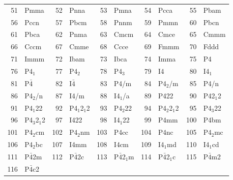 \documentclass[final,12pt,makeidx,DIV=calc]{article}
\begin{document}
{{{{{{\begin{table}[h!]
\begin{center}
\begin{tabular}{||r|l||r|l||r|l||r|l||r|l||}
51     & Pmma               & 
52     & Pnna               & 
53     & Pmna               & 
54     & Pcca               & 
55     & Pbam               \\
56     & Pccn               & 
57     & Pbcm               & 
58     & Pnnm               & 
59     & Pmmn               & 
60     & Pbcn               \\
61     & Pbca               & 
62     & Pnma               & 
63     & Cmcm               & 
64     & Cmce               & 
65     & Cmmm               \\
66     & Cccm               & 
67     & Cmme               & 
68     & Ccce               & 
69     & Fmmm               & 
70     & Fddd               \\
71     & Immm               & 
72     & Ibam               & 
73     & Ibca               & 
74     & Imma               & 
75     & P4                 \\
76     & P4$_1$             & 
77     & P4$_2$             & 
78     & P4$_3$             & 
79     & I4                 & 
80     & I4$_1$             \\
81     & P$\bar{4}$                & 
82     & I$\bar{4}$                & 
83     & P4/m               & 
84     & P4$_2$/m           & 
85     & P4/n               \\
86     & P4$_2$/n           & 
87     & I4/m               & 
88     & I4$_1$/a           & 
89     & P422               & 
90     & P42$_1$2           \\
91     & P4$_1$22           & 
92     & P4$_1$2$_1$2       & 
93     & P4$_2$22           & 
94     & P4$_2$2$_1$2       & 
95     & P4$_3$22           \\
96     & P4$_3$2$_1$2       & 
97     & I422               & 
98     & I4$_1$22           & 
99     & P4mm               & 
100    & P4bm               \\
101    & P4$_2$cm           & 
102    & P4$_2$nm           & 
103    & P4cc               & 
104    & P4nc               & 
105    & P4$_2$mc           \\
106    & P4$_2$bc           & 
107    & I4mm               & 
108    & I4cm               & 
109    & I4$_1$md           & 
110    & I4$_1$cd           \\
111    & P$\bar{4}$2m              & 
112    & P$\bar{4}$2c              & 
113    & P$\bar{4}$2$_1$m          & 
114    & P$\bar{4}$2$_1$c          & 
115    & P$\bar{4}$m2              \\
116    & P$\bar{4}$c2              & 

\end{tabular}
\end{center}
\end{table}}}}}}}
\end{document}

